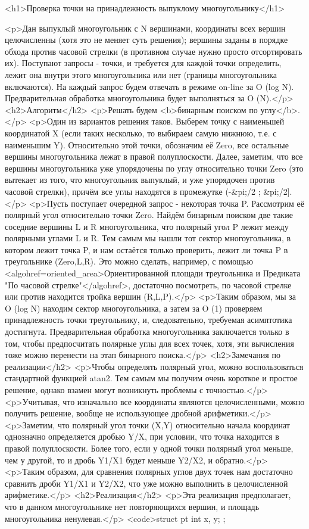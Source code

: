 <h1>Проверка точки на принадлежность выпуклому многоугольнику</h1>

<p>Дан выпуклый многоугольник с N вершинами, координаты всех вершин целочисленны (хотя это не меняет суть решения); вершины заданы в порядке обхода против часовой стрелки (в противном случае нужно просто отсортировать их). Поступают запросы - точки, и требуется для каждой точки определить, лежит она внутри этого многоугольника или нет (границы многоугольника включаются). На каждый запрос будем отвечать в режиме on-line за O (log N). Предварительная обработка многоугольника будет выполняться за O (N).</p>
<h2>Алгоритм</h2>
<p>Решать будем <b>бинарным поиском по углу</b>.</p>
<p>Один из вариантов решения таков. Выберем точку с наименьшей координатой X (если таких несколько, то выбираем самую нижнюю, т.е. с наименьшим Y). Относительно этой точки, обозначим её Zero, все остальные вершины многоугольника лежат в правой полуплоскости. Далее, заметим, что все вершины многоугольника уже упорядочены по углу относительно точки Zero (это вытекает из того, что многоугольник выпуклый, и уже упорядочен против часовой стрелки), причём все углы находятся в промежутке (-&pi;/2 ; &pi;/2].</p>
<p>Пусть поступает очередной запрос - некоторая точка P. Рассмотрим её полярный угол относительно точки Zero. Найдём бинарным поиском две такие соседние вершины L и R многоугольника, что полярный угол P лежит между полярными углами L и R. Тем самым мы нашли тот сектор многоугольника, в котором лежит точка P, и нам остаётся только проверить, лежит ли точка P в треугольнике (Zero,L,R). Это можно сделать, например, с помощью <algohref=oriented_area>Ориентированной площади треугольника и Предиката "По часовой стрелке"</algohref>, достаточно посмотреть, по часовой стрелке или против находится тройка вершин (R,L,P).</p>
<p>Таким образом, мы за O (log N) находим сектор многоугольника, а затем за O (1) проверяем принадлежность точки треугольнику, и, следовательно, требуемая асимптотика достигнута. Предварительная обработка многоугольника заключается только в том, чтобы предпосчитать полярные углы для всех точек, хотя, эти вычисления тоже можно перенести на этап бинарного поиска.</p>
<h2>Замечания по реализации</h2>
<p>Чтобы определять полярный угол, можно воспользоваться стандартной функцией atan2. Тем самым мы получим очень короткое и простое решение, однако взамен могут возникнуть проблемы с точностью.</p>
<p>Учитывая, что изначально все координаты являются целочисленными, можно получить решение, вообще не использующее дробной арифметики.</p>
<p>Заметим, что полярный угол точки (X,Y) относительно начала координат однозначно определяется дробью Y/X, при условии, что точка находится в правой полуплоскости. Более того, если у одной точки полярный угол меньше, чем у другой, то и дробь Y1/X1 будет меньше Y2/X2, и обратно.</p>
<p>Таким образом, для сравнения полярных углов двух точек нам достаточно сравнить дроби Y1/X1 и Y2/X2, что уже можно выполнить в целочисленной арифметике.</p>
<h2>Реализация</h2>
<p>Эта реализация предполагает, что в данном многоугольнике нет повторяющихся вершин, и площадь многоугольника ненулевая.</p>
<code>struct pt {
	int x, y;
};

